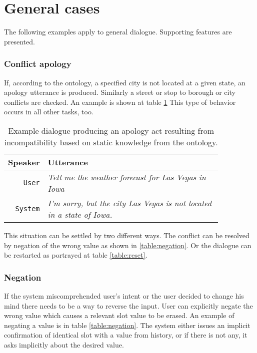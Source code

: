 \section{General cases }

The following examples apply to general dialogue.
Supporting features are presented.

\subsubsection{Conflict apology}

If, according to the ontology, a specified city is not located at a given state, an apology utterance is produced.
Similarly a street or stop to borough or city conflicts are checked.
An example is shown at table \ref{table:conflict}
This type of behavior occurs in all other tasks, too.

\begin{table}[h]
\centering
\begin{tabular}{ | r | p{0.85\linewidth} | } \hline
	Speaker & Utterance \\ \hline
	\texttt{User} & \textit{Tell me the weather forecast for Las Vegas in Iowa} \\ \hline
	\texttt{System} & \textit{I'm sorry, but the city Las Vegas is not located in a state of Iowa.} \\ \hline
\end{tabular}
\caption[Conflict example of incompatible waypoints]{Example dialogue producing an apology act resulting from incompatibility based on static knowledge from the ontology.}
\label{table:conflict}
\end{table}

This situation can be settled by two different ways.
The conflict can be resolved by negation of the wrong value as shown in \ref{table:negation}.
Or the dialogue can be restarted as portrayed at table \ref{table:reset}.

\subsubsection{Negation}

If the system miscomprehended user's intent or the user decided to change his mind there needs to be a way to reverse the input.
User can explicitly negate the wrong value which causes a relevant slot value to be erased.
An example of negating a value is in table \ref{table:negation}.
The system either issues an implicit confirmation of identical slot with a value from history, or if there is not any, it asks implicitly about the desired value.

